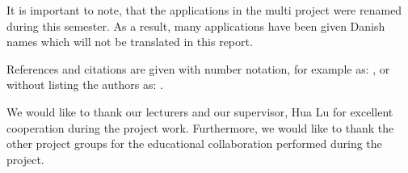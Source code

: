 It is important to note, that the applications in the multi project were renamed during this semester.
As a result, many applications have been given Danish names which will not be translated in this report.

References and citations are given with number notation, for example as: \citet{launcher2011}, or without listing the authors as: \cite{launcher2011}. 

We would like to thank our lecturers and our supervisor, Hua Lu for excellent cooperation during the project work.
Furthermore, we would like to thank the other project groups for the educational collaboration performed during the project.
